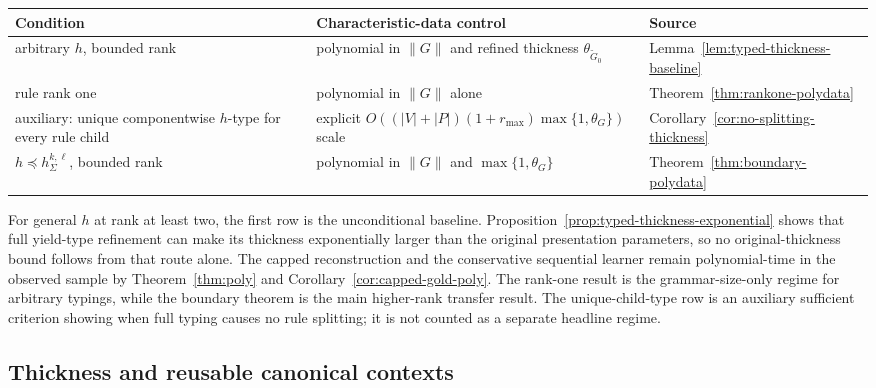 \documentclass[11pt]{article}
\numberwithin{equation}{section}
\theoremstyle{plain}
\theoremstyle{definition}
\theoremstyle{remark}
\begin{document}
\begin{center}
\small
\begin{tabularx}{\textwidth}{>{\raggedright\arraybackslash}p{}
                              >{\raggedright\arraybackslash}p{}
                              X}
\hline
Condition & Characteristic-data control & Source \\
\hline
arbitrary $h$, bounded rank
  & polynomial in $\|G\|$ and refined thickness $\theta_{\widetilde G_0}$
  & Lemma~\ref{lem:typed-thickness-baseline} \\
rule rank one
  & polynomial in $\|G\|$ alone
  & Theorem~\ref{thm:rankone-polydata} \\
auxiliary: unique componentwise $h$-type for every rule child
  & explicit $O((|V|+|P|)(1+r_{\max})\max\{1,\theta_G\})$ scale
  & Corollary~\ref{cor:no-splitting-thickness} \\
$h\preceq h_\Sigma^{k,\ell}$, bounded rank
  & polynomial in $\|G\|$ and $\max\{1,\theta_G\}$
  & Theorem~\ref{thm:boundary-polydata} \\
\hline
\end{tabularx}
\end{center}

For general $h$ at rank at least two, the first row is the unconditional
baseline.  Proposition~\ref{prop:typed-thickness-exponential} shows that full
yield-type refinement can make its thickness exponentially larger than the
original presentation parameters, so no original-thickness bound follows from
that route alone.  The capped reconstruction and the conservative sequential
learner remain polynomial-time in the observed sample by
Theorem~\ref{thm:poly} and Corollary~\ref{cor:capped-gold-poly}.  The rank-one result is the grammar-size-only regime for arbitrary typings,
while the boundary theorem is the main higher-rank transfer result.  The
unique-child-type row is an auxiliary sufficient criterion showing when full
typing causes no rule splitting; it is not counted as a separate headline
regime.

\subsection{Thickness and reusable canonical contexts}
\label{subsec:thickness-contexts}
\end{document}
